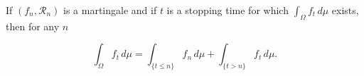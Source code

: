 If $(f_n, \mathcal{R}_n)$ is a martingale and if $t$ is a stopping time for which $\int_{\Omega} f_t \, d\mu$ exists, then for any $n$

$$\int_{\Omega} f_t \, d\mu = \int_{\{t \leq n\}} f_n \, d\mu + \int_{\{t > n\}} f_t \, d\mu.$$
